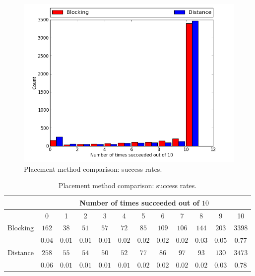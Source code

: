 \begin{figure}[H]
\begin{center}
\includegraphics[width=\textwidth]{Images/placement_success_comparison.png}
\caption{Placement method comparison: success rates.}
\label{fig:placement_success}
\end{center}
\end{figure}

\begin{table}[H]
\begin{center}
\begin{singlespace}
\begin{tabular}{|c||c|c|c|c|c|c|c|c|c|c|c|}
\hline
 & \multicolumn{11}{|c|}{Number of times succeeded out of $10$} \\
\hline
 & 0 & 1 & 2 & 3 & 4 & 5 & 6 & 7 & 8 & 9 & 10 \\
\hline\hline
Blocking & $162$ & $38$ & $51$ & $57$ & $72$ & $85$ & $109$ & $106$ & $144$ & $203$ & $3398$ \\
 & $0.04$ & $0.01$ & $0.01$ & $0.01$ & $0.02$ & $0.02$ & $0.02$ & $0.02$ & $0.03$ & $0.05$ & $0.77$ \\
\hline
 Distance & $258$ & $55$ & $54$ & $50$ & $52$ & $77$ & $86$ & $97$ & $93$ & $130$ & $3473$ \\
  & $0.06$ & $0.01$ & $0.01$ & $0.01$ & $0.01$ & $0.02$ & $0.02$ & $0.02$ & $0.02$ & $0.03$ & $0.78$ \\
\hline
\end{tabular}
\end{singlespace}
\end{center}
\label{tb:placement_success}
\caption{Placement method comparison: success rates.}
\end{table}

